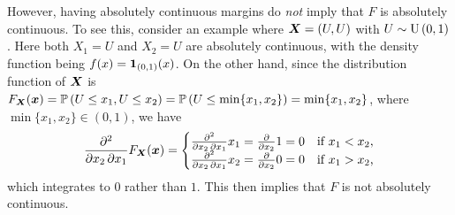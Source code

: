 \begin{enumerate}
However, having absolutely continuous margins do \emph{not} imply that \(F\) is
absolutely continuous. To see this, consider an example where
\(\bm{X}=(U,U)\) with \(U\sim \operatorname{U}\left(0,1\right)\). Here both \(X_1=U\) and
\(X_2=U\) are absolutely continuous, with the density function being
\(f(x)=\mathbf{1}_{(0,1)}(x)\). On the other hand, since the distribution function
of \(\bm{X}\) is \(F_{\bm{X}}(\bm{x})=\mathbb{P}\left(U\le x_1, U\le
x_2\right)=\mathbb{P}\left(U\le\min\{x_1,x_2\}\right)=\min\{x_1,x_2\}\), where \(\min\{x_1,x_2\}\in
(0,1)\), we have
\[
\pdv{}{x_2,x_1}F_{\bm{X}}(\bm{x})=
\begin{cases}
\pdv{}{x_2,x_1}x_1=\pdv{}{x_2}1=0&\text{if \(x_1<x_2\),} \\
\pdv{}{x_2,x_1}x_2=\pdv{}{x_2}0=0&\text{if \(x_1>x_2\),} \\
\end{cases}
\]
which integrates to \(0\) rather than \(1\). This then implies that \(F\) is
not absolutely continuous.
\end{enumerate}
